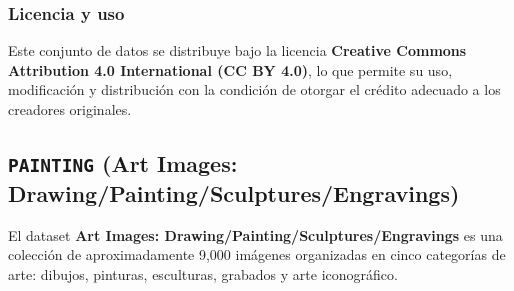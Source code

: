 \subsubsection{Licencia y uso}
Este conjunto de datos se distribuye bajo la licencia
\textbf{Creative Commons Attribution 4.0 International (CC BY 4.0)}, lo que permite su uso, modificación y distribución
con la condición de otorgar el crédito adecuado a los creadores originales.


\subsection{\texttt{PAINTING} (Art Images: Drawing/Painting/Sculptures/Engravings)}\label{subsec:painting}
El dataset \textbf{Art Images: Drawing/Painting/Sculptures/Engravings} es una colección de aproximadamente 9,000
imágenes organizadas en cinco categorías de arte: dibujos, pinturas, esculturas, grabados y arte iconográfico.

